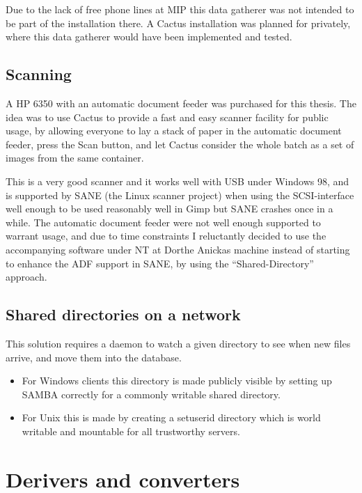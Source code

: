 Due to the lack of free phone lines at MIP this data gatherer was not
intended to be part of the installation there.  A Cactus installation
was planned for  privately,
where this data gatherer would have been implemented and tested.

\subsection{Scanning}

A HP 6350 with an automatic document feeder was purchased for this
thesis.  The idea was to use Cactus to provide a fast and easy scanner
facility for public usage, by allowing everyone to lay a stack of
paper in the automatic document feeder, press the Scan button, and let
Cactus consider the whole batch as a set of images from the same
container.

This is a very good scanner and it works well with USB under Windows
98, and is supported by SANE (the Linux scanner project) when using
the SCSI-interface well enough to be used reasonably well in Gimp but
SANE crashes once in a while.  The automatic document feeder were not
well enough supported to warrant usage, and due to time constraints I
reluctantly decided to use the accompanying software under NT at
Dorthe Anickas machine instead of starting to enhance the ADF support
in SANE, by using the ``Shared-Directory'' approach.


\subsection{Shared directories on a network}

This solution requires a daemon to watch a given directory to see when
new files arrive, and move them into the database.

\begin{itemize}
\item For Windows clients this directory is made publicly visible by
  setting up SAMBA correctly for a commonly writable shared directory.
  
\item For Unix this is made by creating a setuserid directory which is
  world writable and mountable for all trustworthy servers.
\end{itemize}

\section{Derivers and converters}

